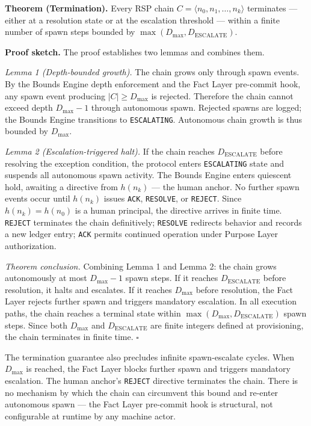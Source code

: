 \medskip
\noindent\textbf{Theorem (Termination).} Every RSP chain $C = \langle n_0, n_1, \ldots, n_k \rangle$ terminates --- either at a resolution state or at the escalation threshold --- within a finite number of spawn steps bounded by $\max(D_{\mathrm{max}}, D_{\mathrm{ESCALATE}})$.

\medskip
\noindent\textbf{Proof sketch.} The proof establishes two lemmas and combines them.

\medskip
\textit{Lemma 1 (Depth-bounded growth).} The chain grows only through spawn events. By the Bounds Engine depth enforcement and the Fact Layer pre-commit hook, any spawn event producing $|C| \geq D_{\mathrm{max}}$ is rejected. Therefore the chain cannot exceed depth $D_{\mathrm{max}} - 1$ through autonomous spawn. Rejected spawns are logged; the Bounds Engine transitions to \texttt{ESCALATING}. Autonomous chain growth is thus bounded by $D_{\mathrm{max}}$.

\medskip
\textit{Lemma 2 (Escalation-triggered halt).} If the chain reaches $D_{\mathrm{ESCALATE}}$ before resolving the exception condition, the protocol enters \texttt{ESCALATING} state and suspends all autonomous spawn activity. The Bounds Engine enters quiescent hold, awaiting a directive from $h(n_k)$ --- the human anchor. No further spawn events occur until $h(n_k)$ issues \texttt{ACK}, \texttt{RESOLVE}, or \texttt{REJECT}. Since $h(n_k) = h(n_0)$ is a human principal, the directive arrives in finite time. \texttt{REJECT} terminates the chain definitively; \texttt{RESOLVE} redirects behavior and records a new ledger entry; \texttt{ACK} permits continued operation under Purpose Layer authorization.

\medskip
\textit{Theorem conclusion.} Combining Lemma 1 and Lemma 2: the chain grows autonomously at most $D_{\mathrm{max}} - 1$ spawn steps. If it reaches $D_{\mathrm{ESCALATE}}$ before resolution, it halts and escalates. If it reaches $D_{\mathrm{max}}$ before resolution, the Fact Layer rejects further spawn and triggers mandatory escalation. In all execution paths, the chain reaches a terminal state within $\max(D_{\mathrm{max}}, D_{\mathrm{ESCALATE}})$ spawn steps. Since both $D_{\mathrm{max}}$ and $D_{\mathrm{ESCALATE}}$ are finite integers defined at provisioning, the chain terminates in finite time. $\square$

The termination guarantee also precludes infinite spawn-escalate cycles. When $D_{\mathrm{max}}$ is reached, the Fact Layer blocks further spawn and triggers mandatory escalation. The human anchor's \texttt{REJECT} directive terminates the chain. There is no mechanism by which the chain can circumvent this bound and re-enter autonomous spawn --- the Fact Layer pre-commit hook is structural, not configurable at runtime by any machine actor.

